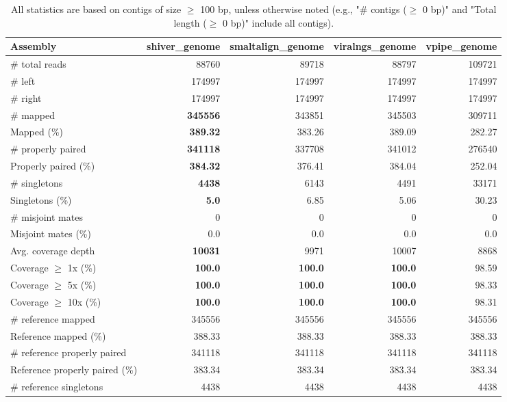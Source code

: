 \documentclass[12pt,a4paper]{article}
\begin{document}
\begin{table}[ht]
\begin{center}
\caption{All statistics are based on contigs of size $\geq$ 100 bp, unless otherwise noted (e.g., "\# contigs ($\geq$ 0 bp)" and "Total length ($\geq$ 0 bp)" include all contigs).}
\begin{tabular}{|l*{4}{|r}|}
\hline
Assembly & shiver\_genome & smaltalign\_genome & viralngs\_genome & vpipe\_genome \\ \hline
\# total reads & 88760 & 89718 & 88797 & 109721 \\ \hline
\# left & 174997 & 174997 & 174997 & 174997 \\ \hline
\# right & 174997 & 174997 & 174997 & 174997 \\ \hline
\# mapped & {\bf 345556} & 343851 & 345503 & 309711 \\ \hline
Mapped (\%) & {\bf 389.32} & 383.26 & 389.09 & 282.27 \\ \hline
\# properly paired & {\bf 341118} & 337708 & 341012 & 276540 \\ \hline
Properly paired (\%) & {\bf 384.32} & 376.41 & 384.04 & 252.04 \\ \hline
\# singletons & {\bf 4438} & 6143 & 4491 & 33171 \\ \hline
Singletons (\%) & {\bf 5.0} & 6.85 & 5.06 & 30.23 \\ \hline
\# misjoint mates & 0 & 0 & 0 & 0 \\ \hline
Misjoint mates (\%) & 0.0 & 0.0 & 0.0 & 0.0 \\ \hline
Avg. coverage depth & {\bf 10031} & 9971 & 10007 & 8868 \\ \hline
Coverage $\geq$ 1x (\%) & {\bf 100.0} & {\bf 100.0} & {\bf 100.0} & 98.59 \\ \hline
Coverage $\geq$ 5x (\%) & {\bf 100.0} & {\bf 100.0} & {\bf 100.0} & 98.33 \\ \hline
Coverage $\geq$ 10x (\%) & {\bf 100.0} & {\bf 100.0} & {\bf 100.0} & 98.31 \\ \hline
\# reference mapped & 345556 & 345556 & 345556 & 345556 \\ \hline
Reference mapped (\%) & 388.33 & 388.33 & 388.33 & 388.33 \\ \hline
\# reference properly paired & 341118 & 341118 & 341118 & 341118 \\ \hline
Reference properly paired (\%) & 383.34 & 383.34 & 383.34 & 383.34 \\ \hline
\# reference singletons & 4438 & 4438 & 4438 & 4438 \\ \hline

\end{tabular}
\end{center}
\end{table}
\end{document}
